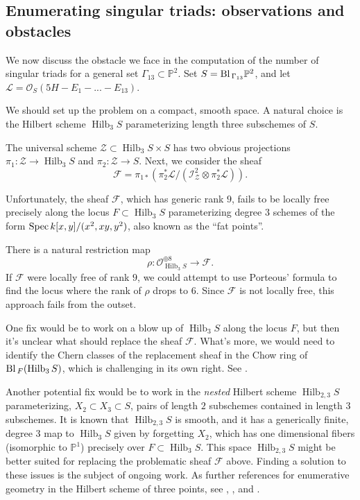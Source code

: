 \documentclass[reqno, 11pt]{amsart}
\theoremstyle{definition}
\theoremstyle{remark}
\numberwithin{equation}{section}
\numberwithin{thm}{section}
\numberwithin{prop}{section}
\numberwithin{lem}{section}
\numberwithin{cor}{section}
\numberwithin{conj}{section}
\numberwithin{defn}{section}
\renewcommand{\to}{\longrightarrow}
\newcommand {\from}{{\colon}}
\newcommand{\Spec}{{\text{\rm Spec}\,}}
\newcommand{\Bl}{{\text{\rm Bl}\,}}
\theoremstyle{plain}
\theoremstyle{definition}
\newcommand\bp{{\mathbb P}}
\newcommand\so{{\mathscr O}}
\newcommand\scf{\mathscr F}
\newcommand\sci{\mathscr I}
\newcommand\scl{\mathscr L}
\newcommand\scz{\mathscr Z}
\DeclareMathOperator\Hilb{Hilb}
\begin{document}
\subsection{Enumerating singular triads: observations and obstacles}
\label{ssec:enumerating-singular-triads}
We now discuss the obstacle we face in the computation of the number of singular triads for a general set $\Gamma_{13} \subset \bp^{2}$.  Set $S = \Bl_{\Gamma_{13}}\bp^{2}$, and let $\scl = \so_{S}(5H - E_{1} - ... -E_{13})$.

We should set up the problem on a compact, smooth space.  A natural choice is the Hilbert scheme $\Hilb_{3}S$ parameterizing length three subschemes of $S$. 

The universal scheme $\scz \subset \Hilb_{3}S \times S$ 
has two obvious projections   $\pi_{1} \from \scz \to \Hilb_{3}S$ and $\pi_{2} \from \scz \to S$.  Next, we consider the sheaf \[\scf = \pi_{1*}(\pi_{2}^{*}\scl/(\sci^{2}_{\scz} \otimes \pi_{2}^{*}\scl)).\]

Unfortunately, the sheaf $\scf$, which has generic rank $9$, fails to be locally free precisely along the locus $F \subset \Hilb_{3}S$ parameterizing degree $3$ schemes of the form $\Spec k[x,y]/(x^{2},xy,y^{2})$, also known as the ``fat points''. 

There is a natural restriction map \[\rho \from \so_{\Hilb_{3}S}^{\oplus 8} \to \scf.\]  If $\scf$ were locally free of rank $9$, we could attempt to use Porteous' formula to find the locus where the rank of $\rho$ drops to $6$. Since $\scf$ is not locally free, this approach fails from the outset.

One fix would be to work on a blow up of $\Hilb_{3}S$ along the locus $F$, but then it's unclear what should replace the sheaf $\scf$.  What's more, we would need to identify the Chern classes of the replacement sheaf in the Chow ring of $\Bl_{F}(\Hilb_{3}S)$, which is challenging in its own right. See \cite{elencwajg:l-anneau-de-chow-des-triangles-du-plan}.

Another potential fix would be to work in the {\sl nested} Hilbert scheme $\Hilb_{2,3}S$ parameterizing, $X_{2} \subset X_{3} \subset S$, pairs of length $2$ subschemes contained in length $3$ subschemes. It is known that $\Hilb_{2,3}S$ is smooth, and it has a generically finite, degree $3$ map to $\Hilb_{3}S$ given by forgetting $X_{2}$, which has one dimensional fibers (isomorphic to $\bp^{1}$) precisely over $F \subset \Hilb_{3}S$. This space $\Hilb_{2,3}S$ might be better suited for replacing the problematic sheaf $\scf$ above.  Finding a solution to these issues is the subject of ongoing work. 
As further references for enumerative geometry in the Hilbert scheme of three points, see \cite{russell:counting-singular-plane-curves-via-hilbert-schemes}, \cite{russell:degenerations-of-monomial-ideals}, and \cite{harrisP:severi-degrees-in-cogenus-3}.
\end{document}
